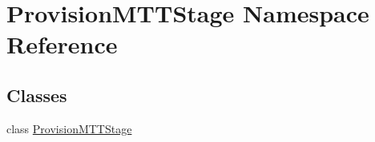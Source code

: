 \hypertarget{namespaceProvisionMTTStage}{\section{Provision\-M\-T\-T\-Stage Namespace Reference}
\label{namespaceProvisionMTTStage}
}
\subsection*{Classes}
\begin{DoxyCompactItemize}
\item 
class \hyperlink{classProvisionMTTStage_1_1ProvisionMTTStage}{Provision\-M\-T\-T\-Stage}
\end{DoxyCompactItemize}
